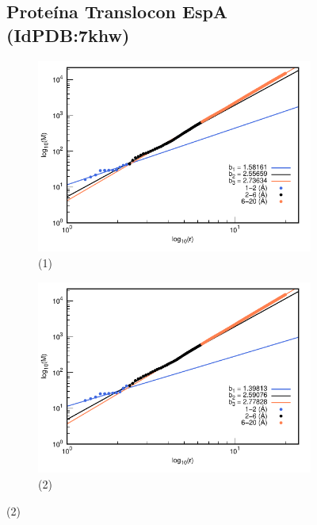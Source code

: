 \begin{figure}[H]
	\subsection*{Proteína Translocon EspA (IdPDB:7khw)}
	
	\hspace{-0.3cm} 
	\begin{subfigure}{0.49\textwidth}
		\centering
		\includegraphics[width=\linewidth,page=1]{graphs/PDBs/7khw/7khwaddH.pdf}
		\caption{(1)}
	\end{subfigure}
	\hspace{0.2cm}
	\begin{subfigure}{0.49\textwidth}
		\centering
		\includegraphics[width=\linewidth,page=1]{graphs/PDBs/7khw/7khwEm.pdf}
		\caption{(2)}
	\end{subfigure}
	

\end{figure}
